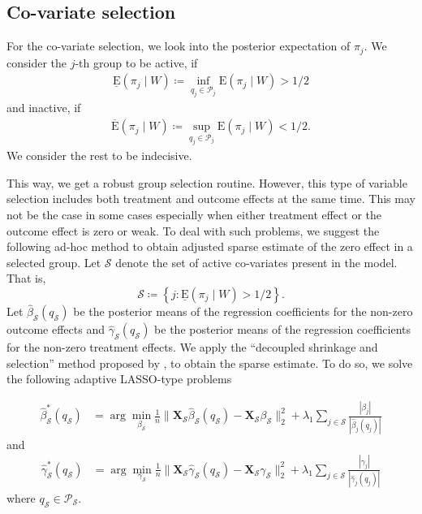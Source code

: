 \documentclass{amsart}
\newcommand{\x}{\boldsymbol{X}}
\newcommand{\lexp}{\underline{\text{E}}}
\newcommand{\uexp}{\overline{\text{E}}}
\begin{document}
\subsection{Co-variate selection}
For the co-variate selection, we look into the posterior expectation of $\pi_j$. 
We consider the $j$-th group to be active, if
\begin{align}
    \lexp (\pi_j\mid W)\coloneqq \inf_{q_j\in \mathcal{P}_j} \text{E}(\pi_j\mid W) > 1/2
\end{align}
and inactive, if
\begin{align}
    \uexp(\pi_j\mid W) \coloneqq \sup_{q_j\in \mathcal{P}_j} \text{E}(\pi_j\mid W)< 1/2.
\end{align}
We consider the rest to be indecisive. 

This way, we get a robust group selection routine. However, this type of variable 
selection includes both treatment and outcome effects at the same time. This may not be the
case in some cases especially when either treatment effect or the outcome effect is zero or
weak. To deal with such problems, we suggest the following ad-hoc method to obtain 
adjusted sparse estimate of the zero effect in a selected group.
Let $\mathcal{S}$ denote the set of active co-variates present in the model. That is,
\begin{equation}
    \mathcal{S}\coloneqq
    \left\{j : \lexp(\pi_j\mid W) > 1/2\right\}.
\end{equation}
Let $\hat{\beta}_{\mathcal{S}}(q_{\mathcal{S}})$ be the posterior means of the regression
coefficients for the non-zero outcome effects and
$\hat{\gamma}_{\mathcal{S}}(q_{\mathcal{S}})$ be the posterior means of the regression
coefficients for the non-zero treatment effects. We apply the 
``decoupled shrinkage and selection'' method proposed by \citet{hahn2015}, to obtain
the sparse estimate. To do so, we solve the following adaptive LASSO-type \cite{Zou2006}
problems

\begin{align}
    \hat{\beta}^*_{\mathcal{S}}(q_{\mathcal{S}}) &= 
    \arg\min_{\beta_{\mathcal{S}}} \frac{1}{n}\|\x_{\mathcal{S}}\hat{\beta}_{\mathcal{S}}(q_{\mathcal{S}})
    - \x_{\mathcal{S}} \beta_{\mathcal{S}}\|_2^2 + \lambda_1\sum_{j\in\mathcal{S}} 
    \frac{|\beta_j|}{|\hat{\beta}_j(q_j)|}
\end{align}
and
\begin{align}
    \hat{\gamma}^*_{\mathcal{S}}(q_{\mathcal{S}}) &= 
    \arg\min_{\gamma_{\mathcal{S}}} \frac{1}{n}\|\x_{\mathcal{S}}\hat{\gamma}_{\mathcal{S}}(q_{\mathcal{S}})
    - \x_{\mathcal{S}} \gamma_{\mathcal{S}}\|_2^2 + \lambda_1\sum_{j\in\mathcal{S}} 
    \frac{|\gamma_j|}{|\hat{\gamma}_j(q_j)|}
\end{align}
where $q_{\mathcal{S}}\in \mathcal{P}_{\mathcal{S}}$.
\end{document}
